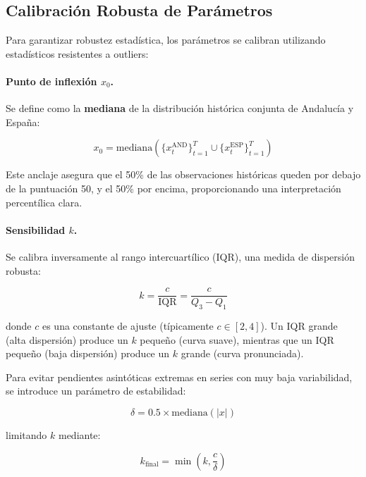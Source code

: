 \documentclass[authoryear,12pt]{elsarticle}
\begin{document}
\subsection{Calibración Robusta de Parámetros}

Para garantizar robustez estadística, los parámetros se calibran utilizando estadísticos resistentes a outliers:

\paragraph{Punto de inflexión $x_0$.} Se define como la \textbf{mediana} de la distribución histórica conjunta de Andalucía y España:

\begin{equation}
x_0 = \text{mediana}\left( \{x^{\text{AND}}_t\}_{t=1}^{T} \cup \{x^{\text{ESP}}_t\}_{t=1}^{T} \right)
\end{equation}

Este anclaje asegura que el 50\% de las observaciones históricas queden por debajo de la puntuación 50, y el 50\% por encima, proporcionando una interpretación percentílica clara.

\paragraph{Sensibilidad $k$.} Se calibra inversamente al rango intercuartílico (IQR), una medida de dispersión robusta:

\begin{equation}
k = \frac{c}{\text{IQR}} = \frac{c}{Q_3 - Q_1}
\end{equation}

donde $c$ es una constante de ajuste (típicamente $c \in [2, 4]$). Un IQR grande (alta dispersión) produce un $k$ pequeño (curva suave), mientras que un IQR pequeño (baja dispersión) produce un $k$ grande (curva pronunciada).

Para evitar pendientes asintóticas extremas en series con muy baja variabilidad, se introduce un parámetro de estabilidad:

\begin{equation}
\delta = 0.5 \times \text{mediana}(|x|)
\end{equation}

limitando $k$ mediante:

\begin{equation}
k_{\text{final}} = \min\left( k, \frac{c}{\delta} \right)
\end{equation}
\end{document}
